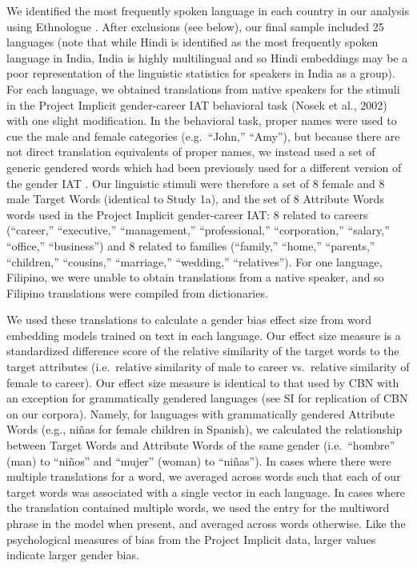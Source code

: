 \documentclass[9pt,twocolumn,twoside]{pnas-new}
\begin{document}
{We identified the most frequently spoken language in each country in our
analysis using Ethnologue \cite{simons2018}. After exclusions
(see below), our final sample included 25
languages (note that while Hindi is identified as the most frequently spoken language in India, India is highly multilingual and so Hindi embeddings may be a poor representation of  the linguistic statistics for speakers in India as a group).
For each language, we obtained translations from native speakers for the
stimuli in the Project Implicit gender-career IAT behavioral task (Nosek
et al., 2002) with one slight modification. In the behavioral task,
proper names were used to cue the male and female categories
(e.g.~\enquote{John,} \enquote{Amy}), but because there are not direct
translation equivalents of proper names, we instead used a set of
generic gendered words which had been previously used for a different
version of the gender IAT \cite[e.g., ``man,'' ``woman;'']{nosek2002harvesting} . Our linguistic stimuli were therefore a set of 8 female and 8
male Target Words (identical to Study 1a), and the set of 8 Attribute
Words words used in the Project Implicit gender-career IAT: 8 related to
careers (\enquote{career,} \enquote{executive,} \enquote{management,}
\enquote{professional,} \enquote{corporation,} \enquote{salary,}
\enquote{office,} \enquote{business}) and 8 related to families
(\enquote{family,} \enquote{home,} \enquote{parents,}
\enquote{children,} \enquote{cousins,} \enquote{marriage,}
\enquote{wedding,} \enquote{relatives}). For one language, Filipino, we
were unable to obtain translations from a native speaker, and so
Filipino translations were compiled from dictionaries.

We used these translations to calculate a gender bias effect size from
word embedding models trained on text in each language. Our effect size
measure is a standardized difference score of the relative similarity of
the target words to the target attributes (i.e.~relative similarity of
male to career vs.~relative similarity of female to career). Our effect
size measure is identical to that used by CBN with an exception for
grammatically gendered languages (see SI for replication of CBN on our
corpora). Namely, for languages with grammatically gendered Attribute
Words (e.g., niñas for female children in Spanish), we calculated the
relationship between Target Words and Attribute Words of the same gender
(i.e.~\enquote{hombre} (man) to \enquote{niños} and \enquote{mujer}
(woman) to \enquote{niñas}). In cases where there were multiple
translations for a word, we averaged across words such that each of our
target words was associated with a single vector in each language. In
cases where the translation contained multiple words, we used the entry
for the multiword phrase in the model when present, and averaged across
words otherwise. Like the psychological measures of bias from the
Project Implicit data, larger values indicate larger gender bias.

}
\end{document}
